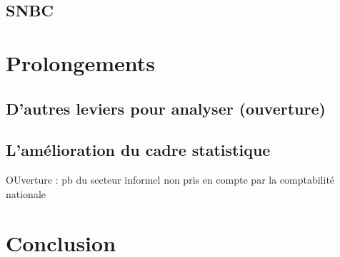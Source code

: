 \documentclass[
]{article}
\begin{document}
\hypertarget{snbc-1}{%
\subsection{SNBC}\label{snbc-1}}

\hypertarget{prolongements}{%
\section{Prolongements}\label{prolongements}}

\hypertarget{dautres-leviers-pour-analyser-ouverture}{%
\subsection{D'autres leviers pour analyser
(ouverture)}\label{dautres-leviers-pour-analyser-ouverture}}

\hypertarget{lamuxe9lioration-du-cadre-statistique}{%
\subsection{L'amélioration du cadre
statistique}\label{lamuxe9lioration-du-cadre-statistique}}

OUverture : pb du secteur informel non pris en compte par la
comptabilité nationale

\hypertarget{conclusion}{%
\section{Conclusion}\label{conclusion}}

\printbibliography[title=Bibliographie]
\end{document}
